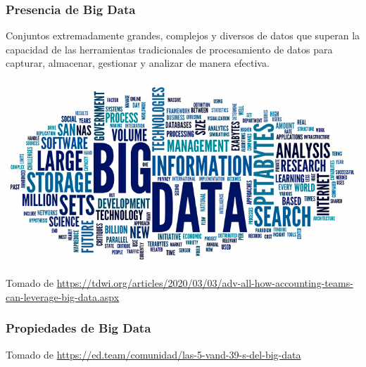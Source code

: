 \documentclass[
10pt, %
aspectratio=169, %
]{beamer}
\begin{document}
	\begin{frame}
		
		\frametitle{Presencia de Big Data}
		
		\begin{alertblock}{}
			Conjuntos extremadamente grandes, complejos y diversos de datos que superan la capacidad de las herramientas tradicionales de procesamiento de datos para capturar, almacenar, gestionar y analizar de manera efectiva.
		\end{alertblock}
		
		
		
		\centering
		\includegraphics[scale=0.4]{big-data.png}
		
		{\scriptsize Tomado de 	\url{https://tdwi.org/articles/2020/03/03/adv-all-how-accounting-teams-can-leverage-big-data.aspx}}
		
		
	\end{frame}
	
	\begin{frame}
		
		\frametitle{Propiedades de Big Data}
		
		
		\centering
		\vspace{6\baselineskip}
		{\scriptsize Tomado de 	\url{https://ed.team/comunidad/las-5-vand-39-s-del-big-data}}
		
	\end{frame}
	
\end{document}
